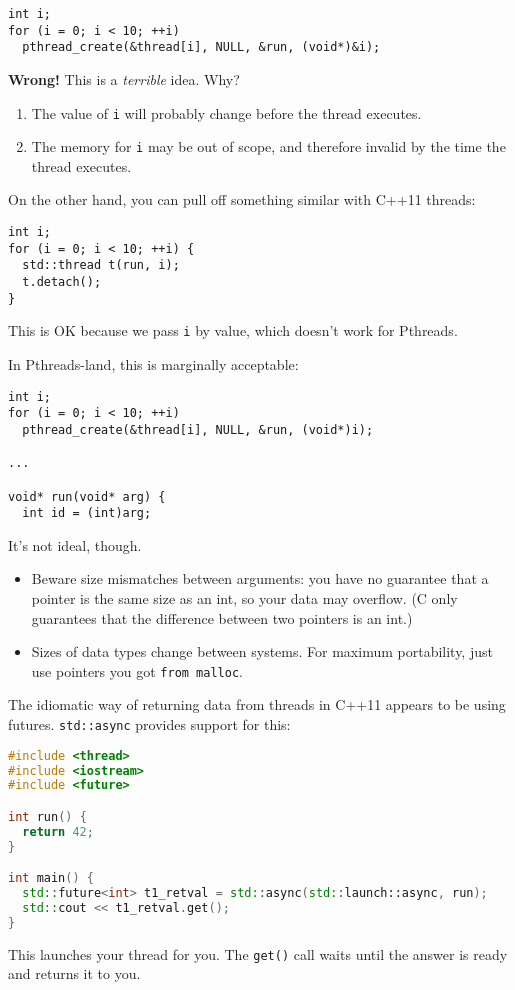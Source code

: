 \documentclass[11pt]{article}
\begin{document}
\begin{lstlisting}
int i;
for (i = 0; i < 10; ++i)
  pthread_create(&thread[i], NULL, &run, (void*)&i);
\end{lstlisting}

{\bf Wrong!} This is a \emph{terrible} idea. Why?
\begin{enumerate}
    \item The value of {\tt i} will probably change before the thread executes.
    \item The memory for {\tt i} may be out of scope, and therefore invalid by
          the time the thread executes.
\end{enumerate}
On the other hand, you can pull off something similar with C++11 threads:
\begin{lstlisting}
int i;
for (i = 0; i < 10; ++i) {
  std::thread t(run, i);
  t.detach();
}
\end{lstlisting}
This is OK because we pass {\tt i} by value, which doesn't work for Pthreads.

In Pthreads-land, this is marginally acceptable:
\begin{lstlisting}
int i;
for (i = 0; i < 10; ++i)
  pthread_create(&thread[i], NULL, &run, (void*)i);

...

void* run(void* arg) {
  int id = (int)arg;
\end{lstlisting}
It's not ideal, though.
  \begin{itemize}
    \item Beware size mismatches between arguments: you have
      no guarantee that a pointer is the same size as an int, so your data
      may overflow. (C only guarantees that the difference between two pointers is an int.)
    \item Sizes of data types change between systems. For maximum
      portability, just use pointers you got {\tt from malloc}.
  \end{itemize}

  The idiomatic way of returning data from threads in C++11 appears to be using
  futures. {\tt std::async} provides support for this:
\begin{lstlisting}[language=C++]
#include <thread>
#include <iostream>
#include <future>

int run() {
  return 42;
}

int main() {
  std::future<int> t1_retval = std::async(std::launch::async, run);
  std::cout << t1_retval.get();
}
\end{lstlisting}
This launches your thread for you. The {\tt get()} call waits until the answer
is ready and returns it to you.
\end{document}
